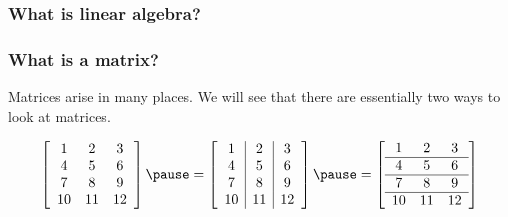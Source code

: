 

\begin{frame}
  \frametitle{What is linear algebra?}
\end{frame}

\begin{frame}
  \frametitle{What is a matrix?}

  Matrices arise in many places.  We will see that there are
  essentially two ways to look at matrices.
  
  \[
  \left[
    \begin{array}{ccc}
      1 & 2 & 3 \\
      4 & 5 & 6 \\
      7 & 8 & 9 \\
      10 & 11 & 12 \\
    \end{array}
    \right]
  \pause
  =
  \left[
    \begin{array}{c|c|c}
      1 & 2 & 3 \\
      4 & 5 & 6 \\
      7 & 8 & 9 \\
      10 & 11 & 12 \\
    \end{array}
    \right]
  \pause
  =
  \left[
    \begin{array}{ccc}
      1 & 2 & 3 \\
      \hline
      4 & 5 & 6 \\
      \hline
      7 & 8 & 9 \\
      \hline
      10 & 11 & 12 \\
    \end{array}
    \right]
  \]
\end{frame}

